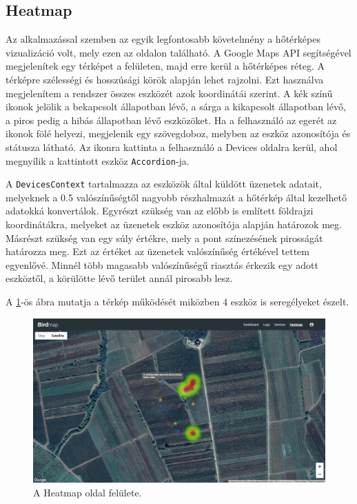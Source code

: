 \subsection{Heatmap}
Az alkalmazással szemben az egyik legfontosabb követelmény a hőtérképes vizualizáció volt,
mely ezen az oldalon található. A Google Maps API segítségével megjelenítek egy térképet a felületen,
majd erre kerül a hőtérképes réteg. A térképre szélességi és hosszúsági körök alapján lehet rajzolni.
Ezt használva megjelenítem a rendszer összes eszközét azok koordinátái szerint.
A kék színű ikonok jelölik a bekapcsolt állapotban lévő, a sárga a kikapcsolt állapotban lévő,
a piros pedig a hibás állapotban lévő eszközöket.
Ha a felhasználó az egerét az ikonok fölé helyezi, megjelenik egy szövegdoboz, melyben az eszköz azonosítója és státusza látható. 
Az ikonra kattinta a felhasználó a Devices oldalra kerül, ahol megnyílik a kattintott eszköz \verb+Accordion+-ja.

A \verb+DevicesContext+ tartalmazza az eszközök által küldött üzenetek adatait,
melyeknek a 0.5 valószínűségtől nagyobb részhalmazát a hőtérkép által kezelhető adatokká konvertálok.
Egyrészt szükség van az előbb is említett földrajzi koordinátákra, melyeket az üzenetek eszköz azonosítója alapján határozok meg.
Másrészt szükség van egy súly értékre, mely a pont színezésének pirosságát határozza meg.
Ezt az értéket az üzenetek valószínűség értékével tettem egyenlővé.
Minnél több magasabb valószínűségű riasztás érkezik egy adott eszköztől, a körülötte lévő terület annál pirosabb lesz.

A \ref{fig:frontend-heatmap}-ös ábra mutatja a térkép működését miközben 4 eszköz is seregélyeket észelt.

\begin{figure}[!ht]
    \centering
    \includegraphics[width=150mm, keepaspectratio]{figures/heatmap.png}
    \caption{A Heatmap oldal felülete.}
    \label{fig:frontend-heatmap}
\end{figure}